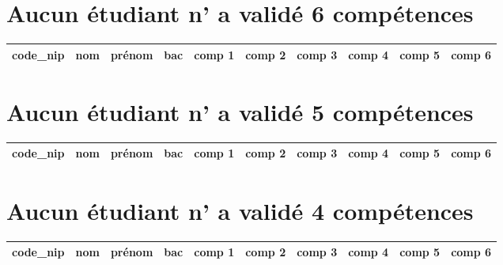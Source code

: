 \documentclass{article}%
\begin{document}
%
\normalsize%
\pagestyle{header}%
\section*{Aucun étudiant n' a validé 6 compétences}%
\label{sec:Aucuntudiantnavalid6comptences}%
\begin{tabular}{|c|l|l|c|c|c|c|c|c|c|}%
\hline%
\rowcolor{bleu}%
code\_nip&nom&prénom&bac&comp 1&comp 2&comp 3&comp 4&comp 5&comp 6\\%
\hline%
\end{tabular}

%
\section*{Aucun étudiant n' a validé 5 compétences}%
\label{sec:Aucuntudiantnavalid5comptences}%
\begin{tabular}{|c|l|l|c|c|c|c|c|c|c|}%
\hline%
\rowcolor{bleu}%
code\_nip&nom&prénom&bac&comp 1&comp 2&comp 3&comp 4&comp 5&comp 6\\%
\hline%
\end{tabular}

%
\section*{Aucun étudiant n' a validé 4 compétences}%
\label{sec:Aucuntudiantnavalid4comptences}%
\begin{tabular}{|c|l|l|c|c|c|c|c|c|c|}%
\hline%
\rowcolor{bleu}%
code\_nip&nom&prénom&bac&comp 1&comp 2&comp 3&comp 4&comp 5&comp 6\\%
\hline%
\end{tabular}

%
\end{document}
